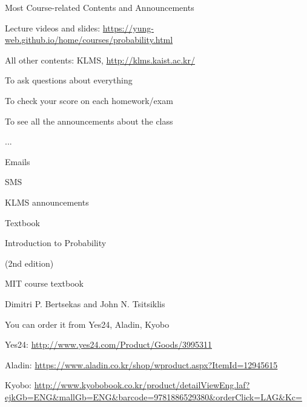 

\begin{frame}{Most Course-related Contents and Announcements}

  \plitemsep 0.1in
  
\bci 

\item<1-> Lecture videos and slides:
  \url{https://yung-web.github.io/home/courses/probability.html}

\item<2-> All other contents: KLMS, \url{http://klms.kaist.ac.kr/}
\bci
\item To ask questions about everything
\item To check your score on each homework/exam
\item To see all the announcements about the class
\item ...
  \eci

\item<3-> 
  \bci
\item Emails
\item SMS
  \item KLMS announcements
  \eci

  \eci

\end{frame}

\begin{frame}{Textbook}

\plitemsep 0.02in

{
\bci 
\item Introduction to Probability 

(2nd edition)

\bci
\item MIT course textbook
\item Dimitri P. Bertsekas and John N. Tsitsiklis
\eci

\item You can order it from Yes24, Aladin, Kyobo
\bci
\item \scriptsize Yes24: \url{http://www.yes24.com/Product/Goods/3995311}
\item \scriptsize Aladin: \url{https://www.aladin.co.kr/shop/wproduct.aspx?ItemId=12945615}
\item \scriptsize Kyobo: \url{http://www.kyobobook.co.kr/product/detailViewEng.laf?ejkGb=ENG&mallGb=ENG&barcode=9781886529380&orderClick=LAG&Kc=}
\eci
  \eci
}
{
\centering
{}
}


\end{frame}


